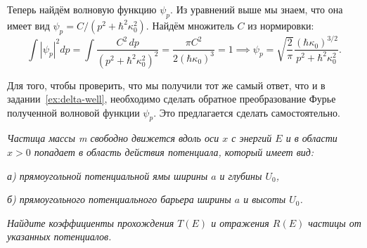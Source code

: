 Теперь найдём волновую функцию $\psi_p$. Из уравнений выше мы знаем, что она
имеет вид $\psi_p = C/(p^2 + \hbar^2\kappa_0^2)$. Найдём множитель $C$ из
нормировки:
\[
  \int|\psi_p|^2dp = \int \frac{C^2\,dp}{(p^2 + \hbar^2\kappa_0^2)^2} =
  \frac{\pi C^2}{2(\hbar\kappa_0)^3} = 1 \implies
  \psi_p = \sqrt{\frac{2}{\pi}}\frac{(\hbar\kappa_0)^{3/2}}{p^2 + \hbar^2\kappa_0^2}.
\]

Для того, чтобы проверить, что мы получили тот же самый ответ, что и в задании
\textnumero\,\ref{ex:delta-well}, необходимо сделать обратное преобразование
Фурье полученной волновой функции $\psi_p$. Это предлагается сделать
самостоятельно.
\qedsq
\begin{exercise}
  \textit{Частица массы m свободно движется вдоль оси $x$ с энергий $E$ и в
    области $x>0$ попадает в область действия потенциала, который имеет вид:}

  \textit{а) прямоугольной потенциальной ямы ширины $a$ и глубины $U_0$,}

  \textit{б) прямоугольного потенциального барьера ширины $a$ и высоты $U_0$.}

  \textit{Найдите коэффициенты прохождения $T(E)$ и отражения $R(E)$ частицы от
    указанных потенциалов.}
\end{exercise}


